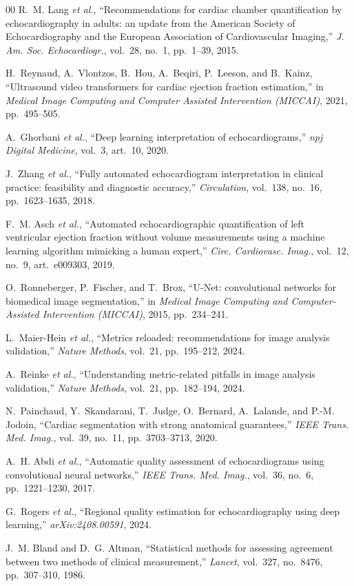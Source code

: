 \documentclass[conference,a4paper]{IEEEtran}
\begin{document}
\begin{thebibliography}{00}
 R.~M. Lang \emph{et al.}, ``Recommendations for cardiac chamber
quantification by echocardiography in adults: an update from the American Society of
Echocardiography and the European Association of Cardiovascular Imaging,'' \emph{J. Am. Soc.
Echocardiogr.}, vol.~28, no.~1, pp.~1--39, 2015.

 H.~Reynaud, A.~Vlontzos, B.~Hou, A.~Beqiri, P.~Leeson, and B.~Kainz,
``Ultrasound video transformers for cardiac ejection fraction estimation,'' in
\emph{Medical Image Computing and Computer Assisted Intervention (MICCAI)}, 2021,
pp.~495--505.

 A.~Ghorbani \emph{et al.}, ``Deep learning interpretation of
echocardiograms,'' \emph{npj Digital Medicine}, vol.~3, art.~10, 2020.

 J.~Zhang \emph{et al.}, ``Fully automated echocardiogram interpretation
in clinical practice: feasibility and diagnostic accuracy,'' \emph{Circulation}, vol.~138,
no.~16, pp.~1623--1635, 2018.

 F.~M. Asch \emph{et al.}, ``Automated echocardiographic quantification of
left ventricular ejection fraction without volume measurements using a machine learning
algorithm mimicking a human expert,'' \emph{Circ. Cardiovasc. Imag.}, vol.~12, no.~9,
art.~e009303, 2019.

 O.~Ronneberger, P.~Fischer, and T.~Brox, ``U-Net: convolutional
networks for biomedical image segmentation,'' in \emph{Medical Image Computing and
Computer-Assisted Intervention (MICCAI)}, 2015, pp.~234--241.

 L.~Maier-Hein \emph{et al.}, ``Metrics reloaded: recommendations for
image analysis validation,'' \emph{Nature Methods}, vol.~21, pp.~195--212, 2024.

 A.~Reinke \emph{et al.}, ``Understanding metric-related pitfalls in
image analysis validation,'' \emph{Nature Methods}, vol.~21, pp.~182--194, 2024.

 N.~Painchaud, Y.~Skandarani, T.~Judge, O.~Bernard, A.~Lalande, and
P.-M. Jodoin, ``Cardiac segmentation with strong anatomical guarantees,'' \emph{IEEE Trans.
Med. Imag.}, vol.~39, no.~11, pp.~3703--3713, 2020.

 A.~H. Abdi \emph{et al.}, ``Automatic quality assessment of
echocardiograms using convolutional neural networks,'' \emph{IEEE Trans. Med. Imag.},
vol.~36, no.~6, pp.~1221--1230, 2017.

 G.~Rogers \emph{et al.}, ``Regional quality estimation for
echocardiography using deep learning,'' \emph{arXiv:2408.00591}, 2024.

 J.~M. Bland and D.~G. Altman, ``Statistical methods for assessing
agreement between two methods of clinical measurement,'' \emph{Lancet}, vol.~327, no.~8476,
pp.~307--310, 1986.

\end{thebibliography}
\end{document}
